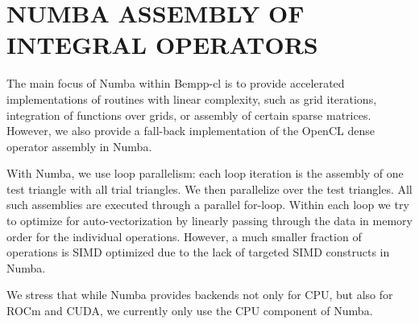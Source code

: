 \section{NUMBA ASSEMBLY OF INTEGRAL OPERATORS}
The main focus of Numba within Bempp-cl is to provide accelerated implementations of routines with linear complexity, such as grid iterations, integration of functions over grids, or assembly of certain sparse matrices. However, we also provide a fall-back implementation of the OpenCL dense operator assembly in Numba.

With Numba, we use loop parallelism: each loop iteration is the assembly of one test triangle with all trial triangles. We then parallelize over the test triangles.
All such assemblies are executed through a parallel for-loop.
Within each loop we try to optimize for auto-vectorization by linearly passing through the data in memory order for the individual operations. However, a much smaller fraction of operations is SIMD optimized due to the lack of targeted SIMD constructs in Numba.

We stress that while Numba provides backends not only for CPU, but also for ROCm and CUDA, we currently only use the CPU component of Numba.
